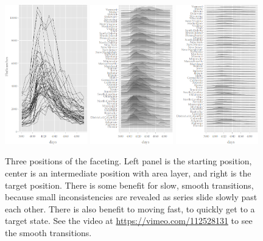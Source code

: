 \documentclass[12pt]{article}
\begin{document}
\begin{itemize}
\begin{center}
\begin{figure}[htp]
\begin{centering}
\includegraphics[width=0.32\textwidth]{graph/pipeline-22-original}
\includegraphics[width=0.32\textwidth]{graph/pipeline-22-smooth}
\includegraphics[width=0.32\textwidth]{graph/pipeline-22-jump}
\end{centering}
\caption{\label{fig:smoothness}Three positions of the faceting.
Left panel is the starting position, center is an intermediate
position with area layer, and right is the target position.
There is some benefit for slow, smooth transitions, because
small inconsistencies are revealed as series slide slowly past
each other. There is also benefit to moving fast, to quickly
get to a target state. See the video at
\url{https://vimeo.com/112528131} to see the smooth transitions.}
\end{figure}
\end{center}


\end{itemize}
\end{document}
